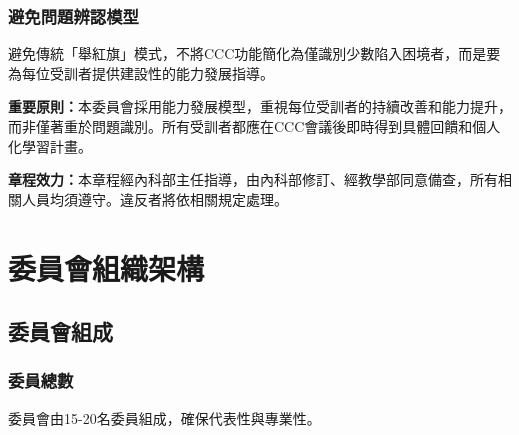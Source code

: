 \documentclass[12pt,a4paper]{article}
\begin{document}
\subsubsection{避免問題辨認模型}
避免傳統「舉紅旗」模式，不將CCC功能簡化為僅識別少數陷入困境者，而是要為每位受訓者提供建設性的能力發展指導。
\begin{importantbox}
\textbf{重要原則：}本委員會採用能力發展模型，重視每位受訓者的持續改善和能力提升，而非僅著重於問題識別。所有受訓者都應在CCC會議後即時得到具體回饋和個人化學習計畫。
\end{importantbox}
\begin{importantbox}
\textbf{章程效力：}本章程經內科部主任指導，由內科部修訂、經教學部同意備查，所有相關人員均須遵守。違反者將依相關規定處理。
\end{importantbox}
\section{委員會組織架構}
\subsection{委員會組成}
\subsubsection{委員總數}
委員會由15-20名委員組成，確保代表性與專業性。
\end{document}
